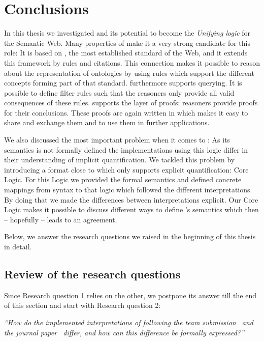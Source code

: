 \chapter{Conclusions}\label{concl}\label{conclusion}
In this thesis we investigated  \nthreelogic and its potential to become the \emph{Unifying logic} for the Semantic Web. 
Many properties of \nthree make it a very strong candidate for this role: 
It is based on \rdf, the most established standard of the Web, and it extends this framework by rules and citations. This connection makes it possible to reason 
about the \rdf representation of \owl ontologies by using rules which support the different concepts forming part of that standard. 
\nthree furthermore supports querying. It is possible to define filter rules such that the reasoners only provide all valid consequences of these rules. \nthree supports the layer 
of proofs: \nthree reasoners provide proofs for their conclusions. These proofs are again written in \nthree which makes it easy to share and exchange them and 
to use them in further applications.

We also discussed the most important problem when it comes to \nthree:  As its semantics is not formally defined the implementations using this 
logic differ in their understanding of implicit quantification. We tackled this problem by introducing a format close to \nthree which only supports explicit 
quantification: \nthree Core Logic. For this Logic we provided the formal semantics and defined concrete mappings from \nthree syntax to that logic which followed 
the different interpretations. By doing that we made the differences between interpretations explicit. Our \nthree Core Logic makes it possible to discuss 
different ways to define \nthree's semantics which then -- hopefully -- leads to an agreement.

Below, we answer the research questions we raised in the beginning of this thesis in detail.


\section{Review of the research questions}
Since Research question 1 relies on the other, we postpone its answer till the end of this section and start with Research question 2:


\emph{``How do the implemented interpretations of \nthree following the \wwwc team submission~\cite{Notation3}
and the journal paper~\cite{N3Logic}
differ, and how can this difference be formally expressed?''} 

